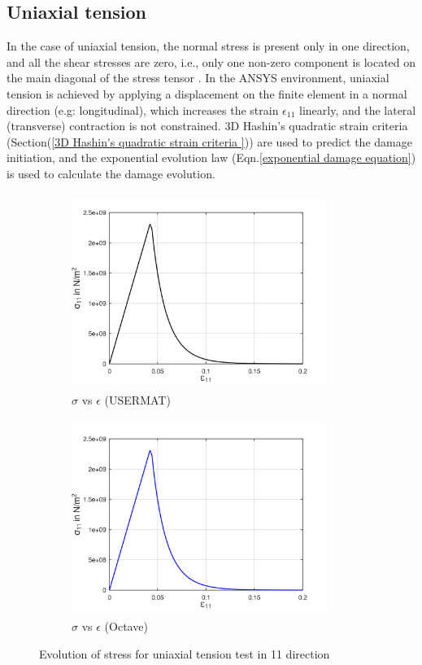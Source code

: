 \documentclass[12pt,a4paper,twoside,openright]{report}
\begin{document}
\subsection{Uniaxial tension}
\indent\indent\indent In the case of uniaxial tension, the normal stress is present only in one direction, and all the shear stresses are zero, i.e., only one non-zero component is located on the main diagonal of the stress tensor \citep{ubt}.  In the ANSYS environment, uniaxial tension is achieved by applying a displacement on the finite element in a normal direction (e.g: longitudinal), which increases the strain $\epsilon_{11}$ linearly, and the lateral (transverse) contraction is not constrained. 3D Hashin's quadratic strain criteria (Section(\ref{3D Hashin's quadratic strain criteria })) are used to predict the damage initiation, and the exponential evolution law (Eqn.\ref{exponential damage equation}) is used to calculate the damage evolution. 
\begin{figure}[hbt!]
     \captionsetup[subfigure]{justification=centering}
      \centering
     \begin{subfigure}{0.4\textwidth}
        \includegraphics[width=8.3cm,height=6.35cm]{21.StressvsStrain_Ansys.png}
         \caption{$\sigma$ vs $\epsilon$ (USERMAT)}
         \label{fig:Stress-Strain relation in Ansys}
     \end{subfigure}
     \hspace{1.8cm}
     \begin{subfigure}{0.4\textwidth}
         \includegraphics[width=8.3cm,height=6.35cm]{21.StressvsStrain_Octave.png}
         \caption{$\sigma$ vs $\epsilon$ (Octave)}
         \label{fig:Stress-Strain relation Octave}
     \end{subfigure}
   \caption{Evolution of stress for uniaxial tension test in 11 direction}
   \label{fig:Evolution of stress  component for a uniaxial tension test in 11 direction} 
\end{figure}
\end{document}
